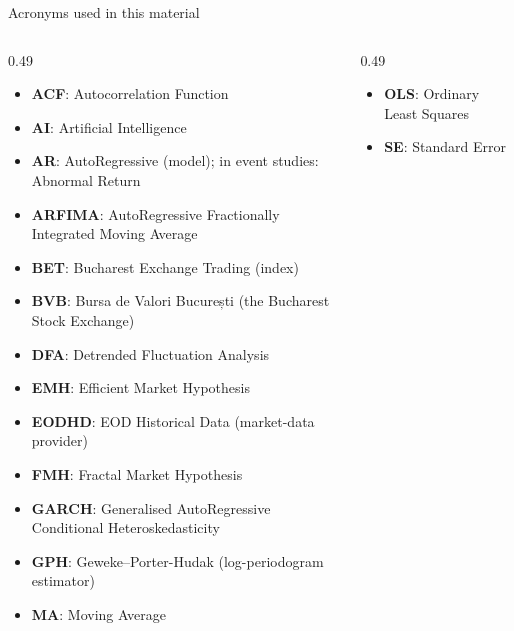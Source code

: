 
{
\begin{frame}[noframenumbering]
    \titlepage
\end{frame}
}
\begin{frame}{Acronyms used in this material}
\begin{columns}[T]
\begin{column}{0.49\textwidth}
\begin{itemize}\setlength{\itemsep}{0pt}
    \item \textbf{ACF}: Autocorrelation Function
    \item \textbf{AI}: Artificial Intelligence
    \item \textbf{AR}: AutoRegressive (model); in event studies: Abnormal Return
    \item \textbf{ARFIMA}: AutoRegressive Fractionally Integrated Moving Average
    \item \textbf{BET}: Bucharest Exchange Trading (index)
    \item \textbf{BVB}: Bursa de Valori București (the Bucharest Stock Exchange)
    \item \textbf{DFA}: Detrended Fluctuation Analysis
    \item \textbf{EMH}: Efficient Market Hypothesis
    \item \textbf{EODHD}: EOD Historical Data (market-data provider)
    \item \textbf{FMH}: Fractal Market Hypothesis
    \item \textbf{GARCH}: Generalised AutoRegressive Conditional Heteroskedasticity
    \item \textbf{GPH}: Geweke–Porter-Hudak (log-periodogram estimator)
    \item \textbf{MA}: Moving Average
\end{itemize}
\end{column}
\begin{column}{0.49\textwidth}
\begin{itemize}\setlength{\itemsep}{0pt}
    \item \textbf{OLS}: Ordinary Least Squares
    \item \textbf{SE}: Standard Error
\end{itemize}
\end{column}
\end{columns}
\end{frame}


